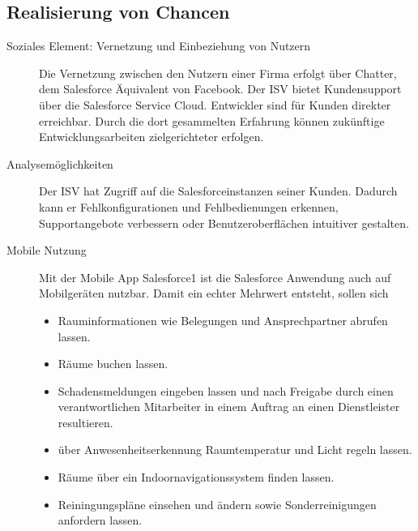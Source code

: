 \subsection{Realisierung von Chancen}
\begin{description}
	\item[Soziales Element: Vernetzung und Einbeziehung von Nutzern] Die 
Vernetzung zwischen den Nutzern einer Firma erfolgt über Chatter, dem 
Salesforce Äquivalent von Facebook. Der ISV bietet Kundensupport über die 
Salesforce Service Cloud. Entwickler sind für Kunden direkter erreichbar. Durch 
die dort gesammelten Erfahrung können zukünftige Entwicklungsarbeiten 
zielgerichteter erfolgen.
	\item[Analysemöglichkeiten] Der ISV hat Zugriff auf die 
Salesforceinstanzen seiner Kunden. Dadurch kann er Fehlkonfigurationen 
und Fehlbedienungen erkennen, Supportangebote verbessern oder 
Benutzeroberflächen intuitiver gestalten.
	\item[Mobile Nutzung] Mit der Mobile App Salesforce1 ist die Salesforce 
Anwendung auch auf Mobilgeräten nutzbar. Damit ein echter Mehrwert entsteht, 
sollen sich
\begin{itemize}
	\item Rauminformationen wie Belegungen und Ansprechpartner abrufen 
lassen.
	\item Räume buchen lassen.
	\item Schadensmeldungen eingeben lassen und nach Freigabe durch einen 
verantwortlichen Mitarbeiter in einem Auftrag an einen Dienstleister 
resultieren.
	\item über Anwesenheitserkennung Raumtemperatur und Licht regeln lassen.
	\item Räume über ein Indoornavigationssystem finden lassen.
	\item Reiningungspläne einsehen und ändern sowie Sonderreinigungen 
anfordern lassen.
\end{itemize}


\end{description}
